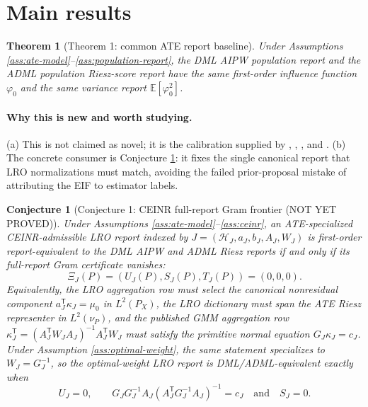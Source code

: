 \documentclass[11pt]{article}
\newcommand{\E}{\mathbb{E}}
\newcommand{\transpose}{\mathsf{T}}
\theoremstyle{definition}
\theoremstyle{plain}
\newtheorem{theorem}{Theorem}
\newtheorem{conjecture}{Conjecture}
\theoremstyle{remark}
\begin{document}
\section{Main results}
\begin{theorem}[Theorem 1: common ATE report baseline]\label{thm:baseline}
Under Assumptions \ref{ass:ate-model}--\ref{ass:population-report}, the DML AIPW
population report and the ADML population Riesz-score report have the same
first-order influence function \(\varphi_0\) and the same variance report
\(\E[\varphi_0^2]\).
\end{theorem}
\paragraph{Why this is new and worth studying.}
(a) This is not claimed as novel; it is the calibration supplied by
\citet{Hahn1998Econometrica}, \citet{HiranoImbensRidder2003Econometrica},
\citet{ChernozhukovEtAl2018DML}, and \citet{ChernozhukovNeweySingh2022AutoDML}.
(b) The concrete consumer is Conjecture \ref{conj:gram-frontier}: it fixes the
single canonical report that LRO normalizations must match, avoiding the
failed prior-proposal mistake of attributing the EIF to estimator labels.

\begin{conjecture}[Conjecture 1: CEINR full-report Gram frontier (NOT YET PROVED)]\label{conj:gram-frontier}
Under Assumptions \ref{ass:ate-model}--\ref{ass:ceinr}, an
ATE-specialized CEINR-admissible LRO report indexed by
\(J=(\mathcal H_J,a_J,b_J,A_J,W_J)\) is first-order report-equivalent to the DML AIPW
and ADML Riesz reports if and only if its full-report Gram certificate vanishes:
\[
\Xi_J(P)=(U_J(P),S_J(P),T_J(P))=(0,0,0).
\]
Equivalently, the LRO aggregation row must select the canonical nonresidual
component \(a_J^\transpose\kappa_J=\mu_0\) in \(L^2(P_X)\), the LRO dictionary
must span the ATE Riesz representer in \(L^2(\nu_P)\), and the published GMM
aggregation row
\(\kappa_J^\transpose=(A_J^\transpose W_JA_J)^{-1}A_J^\transpose W_J\) must
satisfy the primitive normal equation \(G_J\kappa_J=c_J\).  Under Assumption
\ref{ass:optimal-weight}, the same statement specializes to \(W_J=G_J^{-1}\),
so the optimal-weight LRO report is DML/ADML-equivalent exactly when
\[
U_J=0,\qquad
G_JG_J^{-1}A_J(A_J^\transpose G_J^{-1}A_J)^{-1}=c_J
\quad\text{and}\quad S_J=0.
\]
\end{conjecture}
\end{document}
